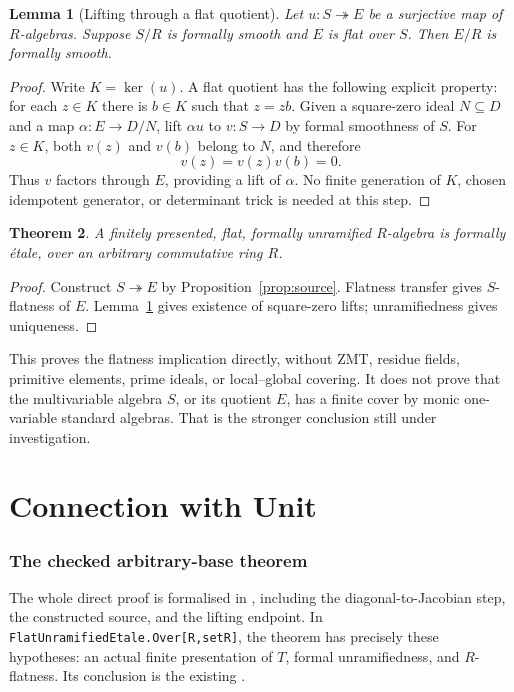 \documentclass[11pt]{article}
\newtheorem{theorem}{Theorem}
\newtheorem{lemma}[theorem]{Lemma}
\begin{document}
\begin{lemma}[Lifting through a flat quotient]\label{lem:quotient}
Let $u:S\twoheadrightarrow E$ be a surjective map of $R$-algebras.
Suppose $S/R$ is formally smooth and $E$ is flat over $S$. Then $E/R$
is formally smooth.
\end{lemma}
\begin{proof}
Write $K=\ker(u)$. A flat quotient has the following explicit property:
for each $z\in K$ there is $b\in K$ such that $z=zb$.
Given a square-zero ideal $N\subseteq D$ and a map $\alpha:E\to D/N$,
lift $\alpha u$ to $v:S\to D$ by formal smoothness of $S$.
For $z\in K$, both $v(z)$ and $v(b)$ belong to $N$, and therefore
\[
                   v(z)=v(z)v(b)=0.
\]
Thus $v$ factors through $E$, providing a lift of $\alpha$.
No finite generation of $K$, chosen idempotent generator, or
determinant trick is needed at this step.
\end{proof}

\begin{theorem}\label{thm:flat}
A finitely presented, flat, formally unramified $R$-algebra is formally
\'etale, over an arbitrary commutative ring $R$.
\end{theorem}
\begin{proof}
Construct $S\twoheadrightarrow E$ by Proposition~\ref{prop:source}.
Flatness transfer gives $S$-flatness of $E$. Lemma~\ref{lem:quotient}
gives existence of square-zero lifts; unramifiedness gives uniqueness.
\end{proof}

This proves the flatness implication directly, without ZMT, residue
fields, primitive elements, prime ideals, or local--global covering.
It does not prove that the multivariable algebra $S$, or its quotient
$E$, has a finite cover by monic one-variable standard algebras.
That is the stronger conclusion still under investigation.

\part{Connection with Unit}

\section{The checked arbitrary-base theorem}

The whole direct proof is formalised in , including
the diagonal-to-Jacobian step, the constructed source, and the lifting
endpoint. In \texttt{FlatUnramifiedEtale.Over[R,setR]}, the theorem
 has precisely
these hypotheses: an actual finite presentation of $T$, formal
unramifiedness, and $R$-flatness. Its conclusion is the existing
.
\end{document}

